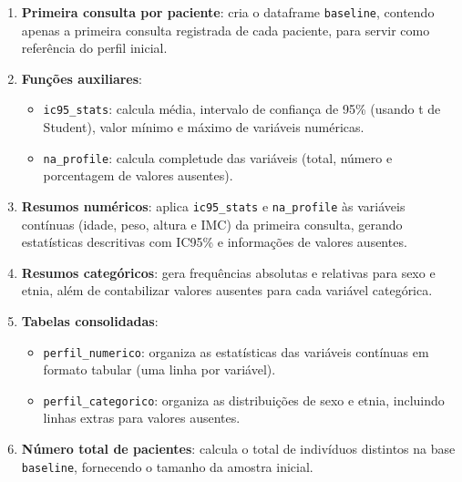 \documentclass[
]{article}
\providecommand{\tightlist}{%
  \setlength{\itemsep}{0pt}\setlength{\parskip}{0pt}}\usepackage{longtable,booktabs,array}
\begin{document}
\begin{enumerate}
\def\labelenumi{\arabic{enumi}.}
\item
  \textbf{Primeira consulta por paciente}: cria o dataframe
  \texttt{baseline}, contendo apenas a primeira consulta registrada de
  cada paciente, para servir como referência do perfil inicial.
\item
  \textbf{Funções auxiliares}:

  \begin{itemize}
  \tightlist
  \item
    \texttt{ic95\_stats}: calcula média, intervalo de confiança de 95\%
    (usando t de Student), valor mínimo e máximo de variáveis
    numéricas.\\
  \item
    \texttt{na\_profile}: calcula completude das variáveis (total,
    número e porcentagem de valores ausentes).
  \end{itemize}
\item
  \textbf{Resumos numéricos}: aplica \texttt{ic95\_stats} e
  \texttt{na\_profile} às variáveis contínuas (idade, peso, altura e
  IMC) da primeira consulta, gerando estatísticas descritivas com IC95\%
  e informações de valores ausentes.
\item
  \textbf{Resumos categóricos}: gera frequências absolutas e relativas
  para sexo e etnia, além de contabilizar valores ausentes para cada
  variável categórica.
\item
  \textbf{Tabelas consolidadas}:

  \begin{itemize}
  \tightlist
  \item
    \texttt{perfil\_numerico}: organiza as estatísticas das variáveis
    contínuas em formato tabular (uma linha por variável).\\
  \item
    \texttt{perfil\_categorico}: organiza as distribuições de sexo e
    etnia, incluindo linhas extras para valores ausentes.
  \end{itemize}
\item
  \textbf{Número total de pacientes}: calcula o total de indivíduos
  distintos na base \texttt{baseline}, fornecendo o tamanho da amostra
  inicial.
\end{enumerate}
\end{document}
